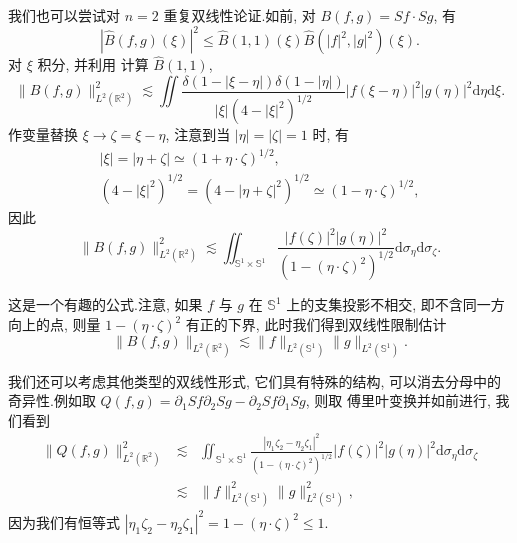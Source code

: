 我们也可以尝试对 $n = 2$ 重复双线性论证.如前, 对 $B(f, g) = Sf \cdot Sg$, 有
\[
|\hat{B}(f, g)(\xi)|^2 \leq \hat{B}(1, 1)(\xi) \hat{B}(|f|^2, |g|^2)(\xi).
\]
对 $\xi$ 积分, 并利用 计算 $\hat{B}(1, 1)$,
\[
\|B(f, g)\|^2_{L^2(\mathbb{R}^2)} \lesssim \iint \frac{\delta(1 - |\xi - \eta|) \delta(1 - |\eta|)}{|\xi| (4 - |\xi|^2)^{1/2}} |f(\xi - \eta)|^2 |g(\eta)|^2 \mathrm{d}\eta \mathrm{d}\xi.
\]
作变量替换 $\xi \to \zeta = \xi - \eta$, 注意到当 $|\eta| = |\zeta| = 1$ 时, 有
\[
\begin{array}{c}
|\xi| = |\eta + \zeta| \simeq (1 + \eta \cdot \zeta)^{1/2}, \\
(4 - |\xi|^2)^{1/2} = (4 - |\eta + \zeta|^2)^{1/2} \simeq (1 - \eta \cdot \zeta)^{1/2},
\end{array}
\]
因此
\begin{equation}
\|B(f, g)\|^2_{L^2(\mathbb{R}^2)} \lesssim \iint_{\mathbb{S}^1 \times \mathbb{S}^1} \frac{|f(\zeta)|^2 |g(\eta)|^2}{(1 - (\eta \cdot \zeta)^2)^{1/2}} \mathrm{d}\sigma_\eta \mathrm{d}\sigma_\zeta.\label{eq:c6-306}
\end{equation}

这是一个有趣的公式.注意, 如果 $f$ 与 $g$ 在 $\mathbb{S}^1$ 上的支集投影不相交, 即不含同一方向上的点, 则量 $1 - (\eta \cdot \zeta)^2$ 有正的下界, 此时我们得到双线性限制估计
\[
\|B(f, g)\|_{L^2(\mathbb{R}^2)} \lesssim \|f\|_{L^2(\mathbb{S}^1)} \|g\|_{L^2(\mathbb{S}^1)}.
\]

我们还可以考虑其他类型的双线性形式, 它们具有特殊的结构, 可以消去分母中的奇异性.例如取 $Q(f, g) = \partial_1 Sf \partial_2 Sg - \partial_2 Sf \partial_1 Sg$, 则取 傅里叶变换并如前进行, 我们看到
\[
\begin{array}{rcl}
\|Q(f, g)\|^2_{L^2(\mathbb{R}^2)} &\lesssim& \iint_{\mathbb{S}^1 \times \mathbb{S}^1} \frac{|\eta_1 \zeta_2 - \eta_2 \zeta_1|^2}{(1 - (\eta \cdot \zeta)^2)^{1/2}} |f(\zeta)|^2 |g(\eta)|^2 \mathrm{d}\sigma_\eta \mathrm{d}\sigma_\zeta \\
&\lesssim& \|f\|^2_{L^2(\mathbb{S}^1)} \|g\|^2_{L^2(\mathbb{S}^1)},
\end{array}
\]
因为我们有恒等式 $|\eta_1 \zeta_2 - \eta_2 \zeta_1|^2 = 1 - (\eta \cdot \zeta)^2 \leq 1$.
